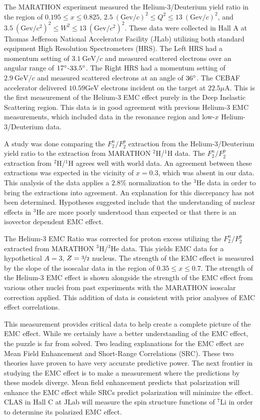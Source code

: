 The MARATHON experiment measured the Helium-3/Deuterium yield ratio in the region of $0.195 \leq x \leq 0.825$, $2.5\ \left(\text{Gev}/c\right)^2 \leq Q^2 \leq 13\ \left(\text{Gev}/c\right)^2$, and $3.5\ \left(\text{Gev}/c^2\right)^2 \leq W^2 \leq 13\ \left(\text{Gev}/c^2\right)^2$. These data were collected in Hall A at Thomas Jefferson National Accelerator Facility (JLab) utilizing both standard equipment High Resolution Spectrometers (HRS). The Left HRS had a momentum setting of $3.1\ \text{GeV}/c$ and measured scattered electrons over an angular range of $17\degree$-$33.5\degree$. The Right HRS had a momentum setting of $2.9\ \text{GeV}/c$ and measured scattered electrons at an angle of $36\degree$. The CEBAF accelerator delivered $10.59 \text{GeV}$ electrons incident on the target at $22.5\mu$A. This is the first measurement of the Helium-3 EMC effect purely in the Deep Inelastic Scattering region. This data is in good agreement with previous Helium-3 EMC measurements, which included data in the resonance region and low-$x$ Helium-3/Deuterium data.

A study was done comparing the $F_2^n/F_2^p$ extraction from the Helium-3/Deuterium yield ratio to the extraction from MARATHON $^2$H/$^1$H data. The $F_2^n/F_2^p$ extraction from $^2$H/$^1$H agrees well with world data. An agreement between these extractions was expected in the vicinity of $x=0.3$, which was absent in our data. This analysis of the data applies a $2.8\%$ normalization to the $^3$He data in order to bring the extractions into agreement. An explanation for this discrepancy has not been determined. Hypotheses suggested include that the understanding of nuclear effects in $^3$He are more poorly understood than expected or that there is an isovector dependent EMC effect.

The Helium-3 EMC Ratio was corrected for proton excess utilizing the $F_2^n/F_2^p$ extracted from MARATHON $^3$H/$^3$He data. This yields EMC data for a hypothetical $A=3$, $Z=\nicefrac{3}{2}$ nucleus. The strength of the EMC effect is measured by the slope of the isoscalar data in the region of $0.35 \leq x \leq 0.7$. The strength of the Helium-3 EMC effect is shown alongside the strength of the EMC effect from various other nuclei from past experiments with the MARATHON isoscalar correction applied. This addition of data is consistent with prior analyses of EMC effect correlations.

This measurement provides critical data to help create a complete picture of the EMC effect. While we certainly have a better understanding of the EMC effect, the puzzle is far from solved. Two leading explanations for the EMC effect are Mean Field Enhancement and Short-Range Correlations (SRC). These two theories have proven to have very accurate predictive power. The next frontier in studying the EMC effect is to make a measurement where the predictions by these models diverge. Mean field enhancement predicts that polarization will enhance the EMC effect while SRCs predict polarization will minimize the effect. CLAS in Hall C at JLab will measure the spin structure functions of $^7$Li in order to determine its polarized EMC effect.